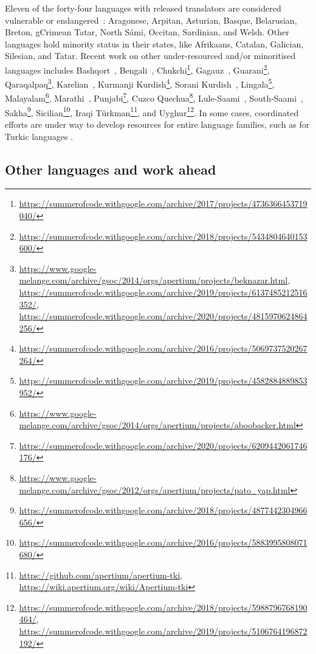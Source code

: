 \documentclass[free]{flammie}
\begin{document}
Eleven of the forty-four languages with released translators are considered
vulnerable or endangered~\cite{moseley2010atlas}: Aragonese, Arpitan, Asturian,
Basque, Belarusian, Breton, gCrimean Tatar, North Sámi, Occitan, Sardinian, and
Welsh. Other languages hold minority status in their states, like Afrikaans,
Catalan, Galician, Silesian, and Tatar. Recent work on other under-resourced
and/or minoritised languages includes Bashqort~\cite{tyers2012prototype},
Bengali~\cite{faridee2009development},
Chukchi\footnote{\url{https://summerofcode.withgoogle.com/archive/2017/projects/4736366453719040/}},
Gagauz~\cite{bayatli2018finite},
Guarani\footnote{\url{https://summerofcode.withgoogle.com/archive/2018/projects/5434804640153600/}},
Qaraqalpaq\footnote{\url{https://www.google-melange.com/archive/gsoc/2014/orgs/apertium/projects/beknazar.html},
\url{https://summerofcode.withgoogle.com/archive/2019/projects/6137485212516352/},
\url{https://summerofcode.withgoogle.com/archive/2020/projects/4815970624864256/}},
Karelian~\cite{pirinen2019workflows}, Kurmanji
Kurdish\footnote{\url{https://summerofcode.withgoogle.com/archive/2016/projects/5069737520267264/}},
Sorani Kurdish~\cite{TranslatorsWithoutBorders2016},
Lingala\footnote{\url{https://summerofcode.withgoogle.com/archive/2019/projects/4582884889853952/}},
Malayalam\footnote{\url{https://www.google-melange.com/archive/gsoc/2014/orgs/apertium/projects/aboobacker.html}},
Marathi~\cite{ravishankar2017finite},
Punjabi\footnote{\url{https://summerofcode.withgoogle.com/archive/2020/projects/6209442061746176/}},
Cuzco
Quechua\footnote{\url{https://www.google-melange.com/archive/gsoc/2012/orgs/apertium/projects/pato_yap.html}},
Lule-Saami~\cite{tyers2009developing}, South-Saami~\cite{antonsen2017northsaami,
tyers2009developing},
Sakha\footnote{\url{https://summerofcode.withgoogle.com/archive/2018/projects/4877442304966656/}},
Sicilian\footnote{\url{https://summerofcode.withgoogle.com/archive/2016/projects/5883995808071680/}},
Iraqi Türkman\footnote{ \url{https://github.com/apertium/apertium-tki},
\url{https://wiki.apertium.org/wiki/Apertium-tki}}, and
Uyghur\footnote{\url{https://summerofcode.withgoogle.com/archive/2018/projects/5988796768190464/},
\url{https://summerofcode.withgoogle.com/archive/2019/projects/5106764196872192/}}.
In some cases, coordinated efforts are under way to develop resources for entire
language families, such as for Turkic languages \cite{washington2020free}.

\subsection{Other languages and work ahead}\label{OtherLanguages}
\end{document}
